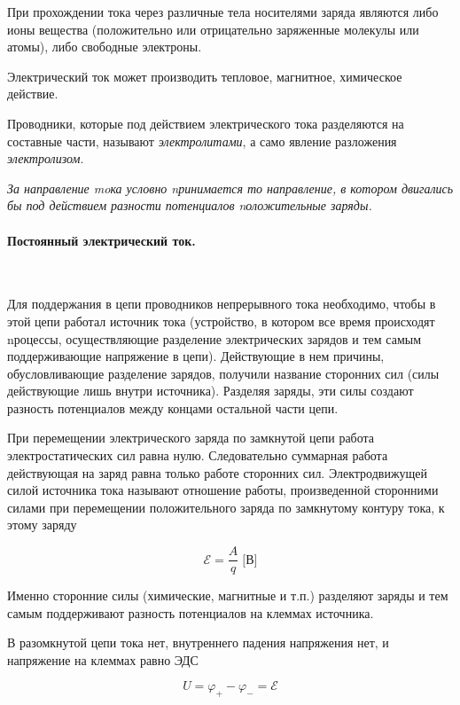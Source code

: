\documentclass[a4paper,12pt]{article}
\begin{document}
		При прохождении тока через различные тела носителями заряда являются либо ионы 
		вещества (по­ложительно или отрицательно заряженные молекулы или атомы), либо свободные 
		электроны.

		Электрический ток может производить тепловое, магнитное, химическое действие.

		Проводники, которые под действием электрического тока разделяются на составные части,
		называют \textit{электролитами}, а само явление разложения \textit{электролизом}.

		\textit{За направление moка условно nринимается то направление, в котором двигались бы под 
		действием разности потенциалов nоложительные заряды.}

		\paragraph{Постоянный электрический ток.} \

		Для поддержа­ния в цепи проводников непрерывного тока необходимо, чтобы в этой цепи 
		работал источник тока (устройство, в котором все время происходят nроцессы, 
		осуществляющие  разделе­ние электрических зарядов и тем самым поддерживающие напряжение
		в цепи). Действующие в нем причины, обусловливающие разделение зарядов, получили 
		название сторонних сил (силы действующие лишь внутри источника). Разделяя заряды,
		эти силы создают разность потенциалов между концами остальной части цепи.

		При перемещении электрического заряда по замкнутой цепи работа электростатических
		сил равна нулю. Следовательно суммарная работа действующая на заряд равна только 
		работе сторонних сил. Электродвижущей силой источника тока называют отношение 
		работы, произведенной сторонними силами при перемещении положительного заряда по 
		замкнутому контуру тока, к этому заряду

		\begin{equation}
			\mathcal{E} = \frac{A}{q} \; \text{[В]}
		\end{equation}

		Именно сторонние силы (химические, магнитные и т.п.) разделяют заряды и тем самым 
		поддерживают разность потенциалов на клеммах источника.

		В разомкнутой цепи тока нет, внутреннего падения напряжения нет, и напряжение на 
		клеммах равно ЭДС

		\begin{equation*}
			U = \varphi_+ - \varphi_- = \mathcal{E}
		\end{equation*}
\end{document}
